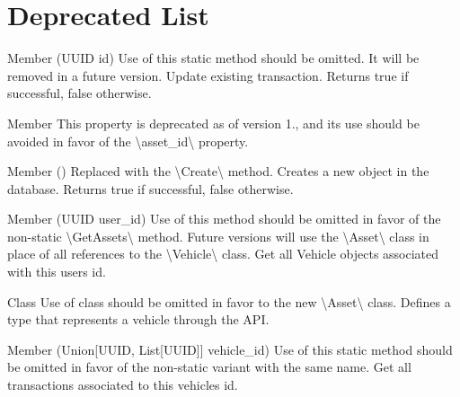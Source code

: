 \chapter{Deprecated List}
\hypertarget{deprecated}{}\label{deprecated}

\begin{DoxyRefList}
\item[Member \doxylink{classtransaction_1_1_transaction_ad72f42b259ab4a22b77a09ca9c73e3b4}{transaction.Transaction.Get} (UUID id)]\label{deprecated__deprecated000002}%
%
Use of this static method should be omitted. It will be removed in a future version. Update existing transaction. Returns true if successful, false otherwise.  
\item[Member \doxylink{classtransaction_1_1_transaction_ad325305c973277d29667703fd9d89b4d}{transaction.Transaction.vehicle\+\_\+id} ]\label{deprecated__deprecated000001}%
%
This property is deprecated as of version 1., and its use should be avoided in favor of the \textbackslash{}\textquotesingle{}asset\+\_\+id\textbackslash{}\textquotesingle{} property.  
\item[Member \doxylink{classuser_1_1_user_a5ab206fc45630c75828f83b30d51c539}{user.User.Craete} ()]\label{deprecated__deprecated000003}%
%
Replaced with the \textbackslash{}\textquotesingle{}Create\textbackslash{}\textquotesingle{} method. Creates a new  object in the database. Returns true if successful, false otherwise.  
\item[Member \doxylink{classuser_1_1_user_a368339a4f32a8c5ba82d55b636aecad1}{user.User.Get\+Vehicles} (UUID user\+\_\+id)]\label{deprecated__deprecated000004}%
%
Use of this method should be omitted in favor of the non-\/static \textbackslash{}\textquotesingle{}Get\+Assets\textbackslash{}\textquotesingle{} method. Future versions will use the \textbackslash{}\textquotesingle{}Asset\textbackslash{}\textquotesingle{} class in place of all references to the \textbackslash{}\textquotesingle{}Vehicle\textbackslash{}\textquotesingle{} class. Get all Vehicle objects associated with this user\textquotesingle{}s id.  
\item[Class \doxylink{classvehicle_1_1_vehicle}{vehicle.Vehicle} ]\label{deprecated__deprecated000005}%
%
Use of class should be omitted in favor to the new \textbackslash{}\textquotesingle{}Asset\textbackslash{}\textquotesingle{} class. Defines a type that represents a vehicle through the API.  
\item[Member \doxylink{classvehicle_1_1_vehicle_a7c85673274327ec4cb6eae0b3aaed386}{vehicle.Vehicle.Get\+Transactions} (Union\mbox{[}UUID, List\mbox{[}UUID\mbox{]}\mbox{]} vehicle\+\_\+id)]\label{deprecated__deprecated000006}%
%
Use of this static method should be omitted in favor of the non-\/static variant with the same name. Get all transactions associated to this vehicle\textquotesingle{}s id. 
\end{DoxyRefList}
